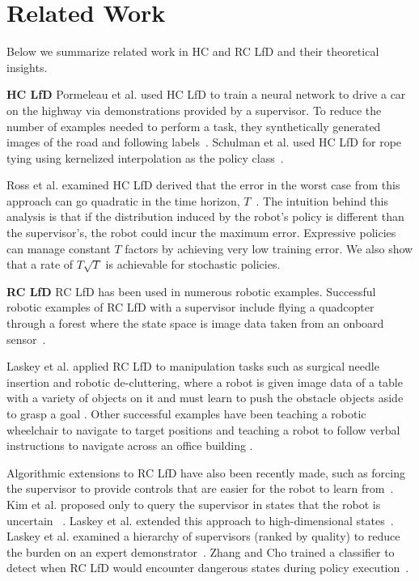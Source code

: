 \documentclass[10pt, conference]{ieeeconf}      %
\newcommand{\ns}{HC LfD }
\newcommand{\nc}{RC LfD }
\begin{document}
\section{Related Work}
Below we summarize related work in HC and RC LfD and their theoretical insights. 

\noindent \textbf {\ns}Pormeleau et al. used \ns to train a neural network to drive a car on the highway via demonstrations provided by a supervisor. To reduce the number of examples needed to perform a task, they synthetically generated images of the road and following labels~\cite{pomerleau1989alvinn}.  Schulman et al. used HC LfD for rope tying using kernelized interpolation as the policy class~\cite{schulman2016learning}. 

Ross et al. examined \ns  derived that the error in the worst case from this approach can go quadratic in the time horizon, $T$~\cite{ross2010efficient}. The intuition behind this analysis is that if the distribution induced by the robot's policy is different than the supervisor's, the robot could incur the maximum error. Expressive policies can manage constant $T$ factors by achieving very low training error. We also show that a rate of $T\sqrt{T}$ is achievable for stochastic policies. 

\noindent \textbf{\nc}
\nc has been used in numerous robotic examples. Successful robotic examples of \nc with a supervisor include flying a quadcopter through a forest where the state space is image data taken from an onboard sensor~\cite{ross2013learning}.

 Laskey et al. applied \nc to manipulation tasks such as surgical needle insertion \cite{laskeyshiv} and robotic de-cluttering, where a robot is given image data of a table with a variety of objects on it and must learn to push the obstacle objects aside to grasp a goal \cite{laskeyrobot}. Other successful examples have been teaching a robotic wheelchair to navigate to target positions and teaching a robot to follow verbal instructions to navigate across an office building \cite{kim2013maximum, duvallet2013imitation}. 

Algorithmic extensions to \nc have also been recently made, such as forcing the supervisor to provide controls that are easier for the robot to learn from~\cite{he2012imitation}.  Kim et al. proposed only to query the supervisor in states that the robot is uncertain~\cite{kim2013maximum} . Laskey et al. extended this approach to high-dimensional states~\cite{laskeyshiv}. Laskey et al. examined a hierarchy of supervisors (ranked by quality)  to reduce the burden on an expert demonstrator~\cite{laskeyrobot}. Zhang and Cho trained a classifier to detect when \nc would encounter dangerous states during policy execution~\cite{zhang2016query}.
\end{document}
